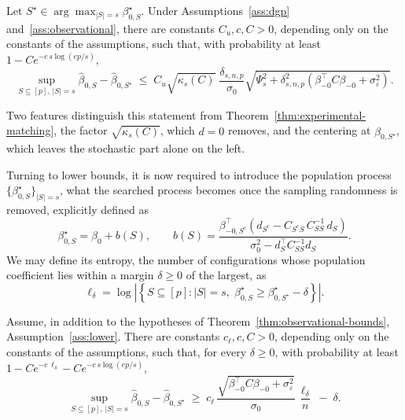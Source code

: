 \begin{theorem}
\label{thm:observational-bounds}
Let $S^\star \in \arg\max_{|S| = s} \beta^\star_{0,S}$. Under
Assumptions~\ref{ass:dgp} and~\ref{ass:observational}, there are
constants $C_u, c, C > 0$, depending only on the constants of the
assumptions, such that, with probability at least
$1 - C e^{-c\, s \log(ep/s)}$,
\begin{equation}\label{eq:observational-upper}
        \sup_{S \subseteq [p],\, |S| = s} \hat \beta_{0, S}
        - \hat \beta_{0, S^\star}
        \;\le\;
        C_u \sqrt{\kappa_s(C)}\;
        \frac{\delta_{s,n,p}}{\sigma_0}
        \sqrt{\Psi_s^2 + \delta_{s,n,p}^2
        \left( \beta_{-0}^\top C \beta_{-0} + \sigma_\varepsilon^2 \right)}.
\end{equation}
\end{theorem}

Two features distinguish this statement from
Theorem~\ref{thm:experimental-matching}, the factor
$\sqrt{\kappa_s(C)}$, which $d = 0$ removes, and the centering at
$\hat\beta_{0,S^\star}$, which leaves the stochastic part alone on the
left.

Turning to lower bounds, it is now required to introduce the population
process $\{ \beta^\star_{0,S} \}_{|S| = s}$, what the searched process
becomes once the sampling randomness is removed, explicitly defined as
\begin{equation}\label{eq:drift}
        \beta^\star_{0,S} = \beta_0 + b(S),
        \qquad
        b(S)
        =
        \frac{\beta_{-0,S^c}^\top
        \left( d_{S^c} - C_{S^c S}\, C_{SS}^{-1}\, d_S \right)}
        {\sigma_0^2 - d_S^\top C_{SS}^{-1} d_S}.
\end{equation}
We may define its entropy, the number of configurations whose population
coefficient lies within a margin $\delta \ge 0$ of the largest, as
\begin{equation}\label{eq:landscape-entropy}
        \ell_\delta
        =
        \log \left| \left\{ S \subseteq [p] : |S| = s,\;
        \beta^\star_{0,S} \ge \beta^\star_{0,S^\star} - \delta
        \right\} \right| .
\end{equation}

\begin{theorem}
\label{thm:observational-lower}
Assume, in addition to the hypotheses of
Theorem~\ref{thm:observational-bounds}, Assumption~\ref{ass:lower}.
There are constants $c_\ell, c, C > 0$, depending only on the constants
of the assumptions, such that, for every $\delta \ge 0$, with
probability at least
$1 - C e^{-c\, \ell_\delta} - C e^{-c\, s \log(ep/s)}$,
\begin{equation}\label{eq:observational-lower}
        \sup_{S \subseteq [p],\, |S| = s} \hat \beta_{0, S}
        - \hat \beta_{0, S^\star}
        \;\ge\;
        c_\ell\,
        \frac{\sqrt{\beta_{-0}^\top C \beta_{-0} + \sigma_\varepsilon^2}}
        {\sigma_0}\, \frac{\ell_\delta}{n}
        \;-\; \delta.
\end{equation}
\end{theorem}

